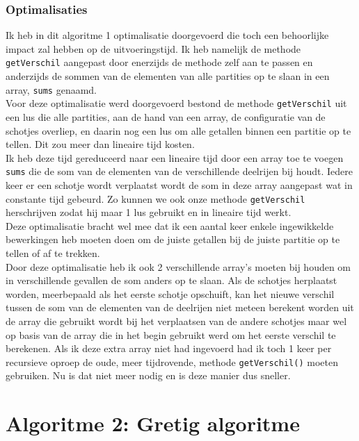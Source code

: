 \documentclass[12pt,a4paper]{report}
\begin{document}
\subsubsection*{Optimalisaties}
Ik heb in dit algoritme 1 optimalisatie doorgevoerd die toch een behoorlijke impact zal hebben op de uitvoeringstijd. Ik heb namelijk de methode \texttt{getVerschil} aangepast door enerzijds de methode zelf aan te passen en anderzijds de sommen van de elementen van alle partities op te slaan in een array, \texttt{sums} genaamd.\\
Voor deze optimalisatie werd doorgevoerd bestond de methode \texttt{getVerschil} uit een lus die alle partities, aan de hand van een array, de configuratie van de schotjes overliep, en daarin nog een lus om alle getallen binnen een partitie op te tellen. Dit zou meer dan lineaire tijd kosten.\\
Ik heb deze tijd gereduceerd naar een lineaire tijd door een array toe te voegen \texttt{sums} die de som van de elementen van de verschillende deelrijen bij houdt. Iedere keer er een schotje wordt verplaatst wordt de som in deze array aangepast wat in constante tijd gebeurd. Zo kunnen we ook onze methode \texttt{getVerschil} herschrijven zodat hij maar 1 lus gebruikt en in lineaire tijd werkt.\\
Deze optimalisatie bracht wel mee dat ik een aantal keer enkele ingewikkelde bewerkingen heb moeten doen om de juiste getallen bij de juiste partitie op te tellen of af te trekken.\\
Door deze optimalisatie heb ik ook 2 verschillende array's moeten bij houden om in verschillende gevallen de som anders op te slaan. Als de schotjes herplaatst worden, meerbepaald als het eerste schotje opschuift, kan het nieuwe verschil tussen de som van de elementen van de deelrijen niet meteen berekent worden uit de array die gebruikt wordt bij het verplaatsen van de andere schotjes maar wel op basis van de array die in het begin gebruikt werd om het eerste verschil te berekenen. Als ik deze extra array niet had ingevoerd had ik toch 1 keer per recursieve oproep de oude, meer tijdrovende, methode \texttt{getVerschil()} moeten gebruiken. Nu is dat niet meer nodig en is deze manier dus sneller. 

\section*{Algoritme 2:  Gretig algoritme}
\end{document}
